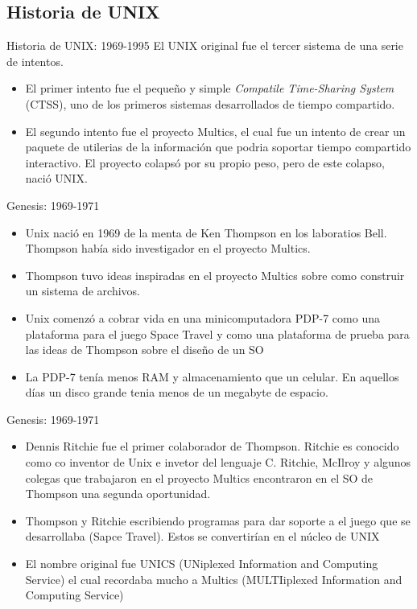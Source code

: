 \documentclass[11pt]{beamer}
\begin{document}
	\subsection{Historia de UNIX}
		\begin{frame}{Historia de UNIX: 1969-1995}
			El UNIX original fue el tercer sistema de una serie de intentos.
			\begin{itemize}
				\item El primer intento fue el pequeño y simple \textit{Compatile Time-Sharing System} (CTSS), uno de los primeros sistemas desarrollados de tiempo compartido.
				\item El segundo intento fue el proyecto Multics, el cual fue un intento de crear un paquete de utilerias de la información que podria soportar tiempo compartido interactivo. El proyecto colapsó por su propio peso, pero de este colapso, nació UNIX.
			\end{itemize}
		\end{frame}
		\begin{frame}{Genesis: 1969-1971}
		 	\begin{itemize}
				\item Unix nació en 1969 de la menta de Ken Thompson en los laboratios Bell. Thompson había sido investigador en el proyecto Multics.
				\item Thompson tuvo ideas inspiradas en el proyecto Multics sobre como construir un sistema de archivos.
				
				\item Unix comenzó a cobrar vida en una minicomputadora PDP-7 como una plataforma para el juego Space Travel y como una plataforma de prueba para las ideas de Thompson sobre el diseño de un SO
				\item La PDP-7 tenía menos RAM y almacenamiento que un celular. En aquellos días un disco grande tenia menos de un megabyte de espacio.
		 	\end{itemize}
		\end{frame}
		\begin{frame}{Genesis: 1969-1971}
		 	\begin{itemize}
				\item Dennis Ritchie fue el primer colaborador de Thompson. Ritchie es conocido como co inventor de Unix e invetor del lenguaje C. Ritchie, McIlroy y algunos colegas que trabajaron en el proyecto Multics encontraron en el SO de Thompson una segunda oportunidad.
				\item Thompson y Ritchie escribiendo programas para dar soporte a el juego que se desarrollaba (Sapce Travel). Estos se convertirían en el núcleo de UNIX
				
				\item El nombre original fue UNICS (UNiplexed Information and Computing Service) el cual recordaba mucho a Multics (MULTIiplexed Information and Computing Service)
		 	\end{itemize}
		\end{frame}
\end{document}
